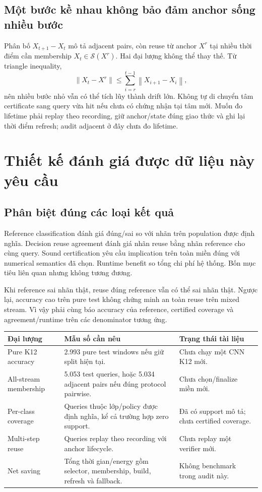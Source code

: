 \documentclass[11pt,a4paper]{article}
\newcommand{\norm}[1]{\left\lVert#1\right\rVert}
\theoremstyle{definition}
\begin{document}
\subsection{Một bước kề nhau không bảo đảm anchor sống nhiều bước}
Phân bố $X_{t+1}-X_t$ mô tả adjacent pairs, còn reuse từ anchor $X^r$ tại
nhiều thời điểm cần membership $X_t\in\mathcal S(X^r)$. Hai đại lượng không
thể thay thế. Từ triangle inequality,
\begin{equation}
\norm{X_t-X^r}\le\sum_{i=r}^{t-1}\norm{X_{i+1}-X_i},
\end{equation}
nên nhiều bước nhỏ vẫn có thể tích lũy thành drift lớn. Không tự di chuyển
tâm certificate sang query vừa hit nếu chưa có chứng nhận tại tâm mới.
Muốn đo lifetime phải replay theo recording, giữ anchor/state đúng giao
thức và ghi lại thời điểm refresh; audit adjacent ở đây chưa đo lifetime.

\section{Thiết kế đánh giá được dữ liệu này yêu cầu}
\subsection{Phân biệt đúng các loại kết quả}
Reference classification đánh giá đúng/sai so với nhãn trên population
được định nghĩa. Decision reuse agreement đánh giá nhãn reuse bằng nhãn
reference cho cùng query. Sound certification yêu cầu implication trên
toàn miền đúng với numerical semantics đã chọn. Runtime benefit so tổng
chi phí hệ thống. Bốn mục tiêu liên quan nhưng không tương đương.

Khi reference sai nhãn thật, reuse đúng reference vẫn có thể sai nhãn thật.
Ngược lại, accuracy cao trên pure test không chứng minh an toàn reuse trên
mixed stream. Vì vậy phải cùng báo accuracy của reference, certified
coverage và agreement/runtime trên các denominator tương ứng.

\begin{tabularx}{\linewidth}{@{}P{3cm}Y Y@{}}\toprule
Đại lượng & Mẫu số cần nêu & Trạng thái tài liệu\\\midrule
Pure K12 accuracy & 2.993 pure test windows nếu giữ split hiện tại. & Chưa chạy một CNN K12 mới.\\
All-stream membership & 5.053 test queries, hoặc 5.034 adjacent pairs nếu đúng protocol pairwise. & Chưa chọn/finalize miền mới.\\
Per-class coverage & Queries thuộc lớp/policy được định nghĩa, kể cả trường hợp zero support. & Đã có support mô tả; chưa certified coverage.\\
Multi-step reuse & Queries replay theo recording với anchor lifecycle. & Chưa replay một verifier mới.\\
Net saving & Tổng thời gian/energy gồm selector, membership, build, refresh và fallback. & Không benchmark trong audit này.\\\bottomrule
\end{tabularx}
\end{document}

